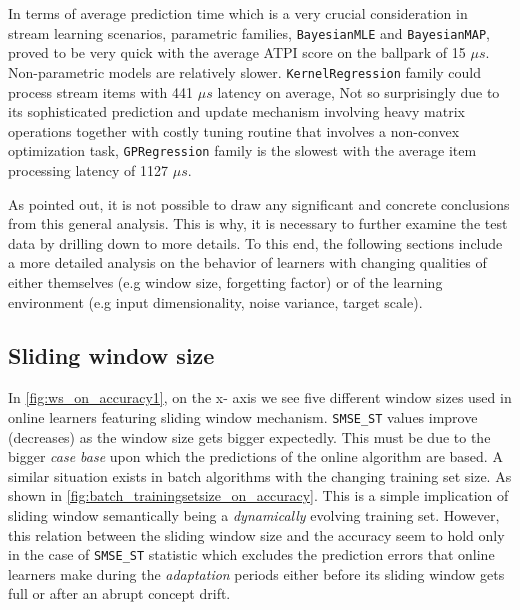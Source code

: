 In terms of average prediction time which is a very crucial consideration in stream learning scenarios, parametric families, \texttt{BayesianMLE} and \texttt{BayesianMAP}, proved to be very quick with the average ATPI score on the ballpark of 15 $\mu s$. Non-parametric models are relatively slower. \texttt{KernelRegression} family could process stream items with 441 $\mu s$ latency on average, Not so surprisingly due to its sophisticated prediction and update mechanism involving heavy matrix operations together with costly tuning routine that involves a non-convex optimization task, \texttt{GPRegression} family is the slowest with the average item processing latency of 1127 $\mu s$.

As pointed out, it is not possible to draw any significant and concrete conclusions from this general analysis. This is why, it is necessary to further examine the test data by drilling down to more details. To this end, the following sections include a more detailed analysis on the behavior of learners with changing qualities of either themselves (e.g window size, forgetting factor) or of the learning environment (e.g input dimensionality, noise variance, target scale).

\subsection{Sliding window size}

In \ref{fig:ws_on_accuracy1}, on the x- axis we see five different window sizes used in online learners featuring sliding window mechanism. \texttt{SMSE\_ST} values improve (decreases) as the window size gets bigger expectedly. This must be due to the bigger \textit{case base} upon which the predictions of the online algorithm are based. A similar situation exists in batch algorithms with the changing training set size. As shown in \ref{fig:batch_trainingsetsize_on_accuracy}. This is a simple implication of sliding window semantically being a \textit{dynamically} evolving training set. However, this relation between the sliding window size and the accuracy seem to hold only in the case of \texttt{SMSE\_ST} statistic which excludes the prediction errors that online learners make during the \textit{adaptation} periods either before its sliding window gets full or after an abrupt concept drift. 


